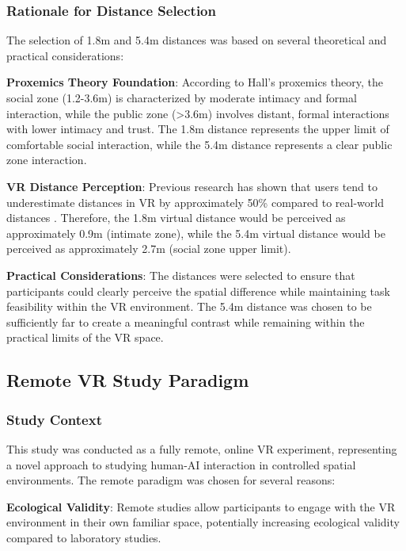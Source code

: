 \documentclass[12pt]{article}
\begin{document}
\subsubsection{Rationale for Distance Selection}

The selection of 1.8m and 5.4m distances was based on several theoretical and practical considerations:

\textbf{Proxemics Theory Foundation}: According to Hall's proxemics theory, the social zone (1.2-3.6m) is characterized by moderate intimacy and formal interaction, while the public zone (>3.6m) involves distant, formal interactions with lower intimacy and trust. The 1.8m distance represents the upper limit of comfortable social interaction, while the 5.4m distance represents a clear public zone interaction.

\textbf{VR Distance Perception}: Previous research has shown that users tend to underestimate distances in VR by approximately 50\% compared to real-world distances \citep{renner2013perceived}. Therefore, the 1.8m virtual distance would be perceived as approximately 0.9m (intimate zone), while the 5.4m virtual distance would be perceived as approximately 2.7m (social zone upper limit).

\textbf{Practical Considerations}: The distances were selected to ensure that participants could clearly perceive the spatial difference while maintaining task feasibility within the VR environment. The 5.4m distance was chosen to be sufficiently far to create a meaningful contrast while remaining within the practical limits of the VR space.

\subsection{Remote VR Study Paradigm}

\subsubsection{Study Context}

This study was conducted as a fully remote, online VR experiment, representing a novel approach to studying human-AI interaction in controlled spatial environments. The remote paradigm was chosen for several reasons:

\textbf{Ecological Validity}: Remote studies allow participants to engage with the VR environment in their own familiar space, potentially increasing ecological validity compared to laboratory studies.
\end{document}
